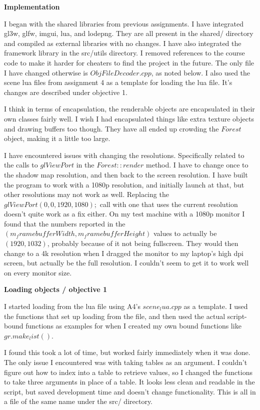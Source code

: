 \documentclass[10pt]{article}
\begin{document}
	
	\begin{center}
		\large\bf Implementation
	\end{center}
	
	I began with the shared libraries from previous assignments. I have integrated gl3w, glfw, imgui, lua, and lodepng. They are all present in the shared/ directory and compiled as external libraries with no changes. I have also integrated the framework library in the src/utils directory. I removed references to the course code to make it harder for cheaters to find the project in the future. The only file I have changed otherwise is $ObjFileDecoder.cpp$, as noted below. I also used the scene lua files from assignment 4 as a template for loading the lua file. It's changes are described under objective 1.
	
	I think in terms of encapsulation, the renderable objects are encapsulated in their own classes fairly well. I wish I had encapsulated things like extra texture objects and drawing buffers too though. They have all ended up crowding the $Forest$ object, making it a little too large.
	
	I have encountered issues with changing the resolutions. Specifically related to the calls to $glViewPort$ in the $Forest::render$ method. I have to change once to the shadow map resolution, and then back to the screen resolution. I have built the program to work with a 1080p resolution, and initially launch at that, but other resolutions may not work as well. Replacing the $glViewPort(0, 0, 1920, 1080);$ call with one that uses the current resolution doesn't quite work as a fix either. On my test machine with a 1080p monitor I found that the numbers reported in the $(m_framebufferWidth, m_framebufferHeight)$ values to actually be $(1920, 1032)$, probably because of it not being fullscreen. They would then change to a 4k resolution when I dragged the monitor to my laptop's high dpi screen, but actually be the full resolution. I couldn't seem to get it to work well on every monitor size.
	
	\begin{center}
		\bf Loading objects / objective 1
	\end{center}
	
	I started loading from the lua file using A4's $scene_lua.cpp$ as a template. I used the functions that set up loading from the file, and then used the actual script-bound functions as examples for when I created my own bound functions like $gr.make_list()$.
	
	I found this took a lot of time, but worked fairly immediately when it was done. The only issue I encountered was with taking tables as an argument. I couldn't figure out how to index into a table to retrieve values, so I changed the functions to take three arguments in place of a table. It looks less clean and readable in the script, but saved development time and doesn't change functionality. This is all in a file of the same name under the src/ directory.
	
\end{document}
